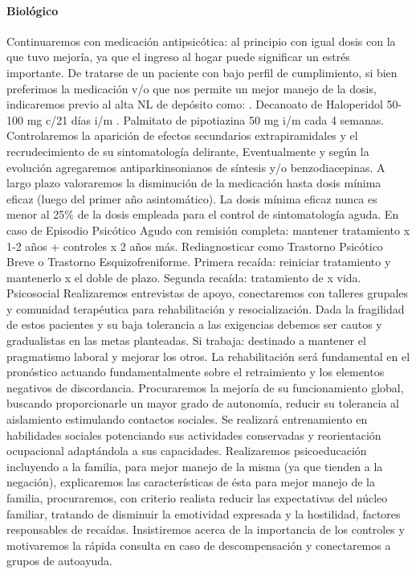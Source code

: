 \documentclass{scrbook}
\begin{document}
\paragraph{Biológico}
Continuaremos con medicación antipsicótica\cite{ostuzzi2022preventing}: al principio con igual dosis con la que tuvo mejoría, ya que el ingreso al hogar puede significar un estrés importante. De tratarse de un paciente con bajo perfil de cumplimiento, si bien preferimos la medicación v/o que nos permite un mejor manejo de la dosis, indicaremos previo al alta NL de depósito como: . Decanoato de Haloperidol 50-100 mg c/21 días i/m . Palmitato de pipotiazina 50 mg i/m cada 4 semanas. Controlaremos la aparición de efectos secundarios extrapiramidales y el recrudecimiento de su sintomatología delirante, Eventualmente y según la evolución agregaremos antiparkinsonianos de síntesis y/o benzodiacepinas. A largo plazo valoraremos la disminución de la medicación hasta dosis mínima eficaz (luego del primer año asintomático). La dosis mínima eficaz nunca es menor al 25\% de la dosis empleada para el control de sintomatología aguda. En caso de Episodio Psicótico Agudo con remisión completa: mantener tratamiento x 1-2 años + controles x 2 años más. Rediagnosticar como Trastorno Psicótico Breve o Trastorno Esquizofreniforme. Primera recaída: reiniciar tratamiento y mantenerlo x el doble de plazo. Segunda recaída: tratamiento de x vida. Psicosocial Realizaremos entrevistas de apoyo, conectaremos con talleres grupales y comunidad terapéutica para rehabilitación y resocialización. Dada la fragilidad de estos pacientes y su baja tolerancia a las exigencias debemos ser cautos y gradualistas en las metas planteadas. Si trabaja: destinado a mantener el pragmatismo laboral y mejorar los otros. La rehabilitación será fundamental en el pronóstico actuando fundamentalmente sobre el retraimiento y los elementos negativos de discordancia. Procuraremos la mejoría de su funcionamiento global, buscando proporcionarle un mayor grado de autonomía, reducir su tolerancia al aislamiento estimulando contactos sociales. Se realizará entrenamiento en habilidades sociales potenciando sus actividades conservadas y reorientación ocupacional adaptándola a sus capacidades. Realizaremos psicoeducación incluyendo a la familia, para mejor manejo de la misma (ya que tienden a la negación), explicaremos las características de ésta para mejor manejo de la familia, procuraremos, con criterio realista reducir las expectativas del núcleo familiar, tratando de disminuir la emotividad expresada y la hostilidad, factores responsables de recaídas. Insistiremos acerca de la importancia de los controles y motivaremos la rápida consulta en caso de descompensación y conectaremos a grupos de autoayuda.
\end{document}
